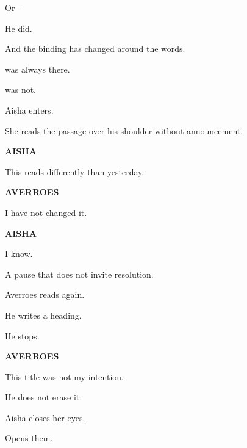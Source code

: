 \medskip

Or---

\medskip

He did.

\medskip

And the binding has changed around the words.

\medskip

 was always there.

 was not.

\medskip

Aisha enters.

She reads the passage over his shoulder without announcement.

\medskip

\textbf{AISHA}

This reads differently than yesterday.

\medskip

\textbf{AVERROES}

I have not changed it.

\medskip

\textbf{AISHA}

I know.

\medskip

A pause that does not invite resolution.

\medskip


\medskip

Averroes reads again.

He writes a heading.

\medskip


\medskip

He stops.

\medskip

\textbf{AVERROES}

This title was not my intention.

\medskip

He does not erase it.

\medskip

Aisha closes her eyes.

\medskip

Opens them.

